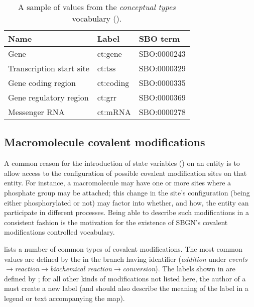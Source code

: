 \begin{table}[h]
  \centering
  \begin{tabular}{l>{\ttfamily}l>{\ttfamily}l}
    \toprule
    \textbf{Name}              & \textbf{\rmfamily Label} & \textbf{\rmfamily SBO term} \\
    \midrule
    Gene                      & ct:gene   & SBO:0000243\\
    Transcription start site  & ct:tss    & SBO:0000329\\
    Gene coding region        & ct:coding & SBO:0000335\\
    Gene regulatory region    & ct:grr    & SBO:0000369\\
    Messenger RNA             & ct:mRNA   & SBO:0000278\\
    \bottomrule
  \end{tabular}
  \caption{A sample of values from the \emph{conceptual types} vocabulary
    ().}
  \label{tab:conceptual-types-cv}
\end{table}


\subsection{Macromolecule covalent modifications}
\label{sec:covalent-mod-cv}

A common reason for the introduction of state variables () on an entity is to allow access to the configuration of possible covalent modification sites on that entity.  For instance, a macromolecule may have one or more sites where a phosphate group may be attached; this change in the site's configuration (\ie being either phosphorylated or not) may factor into whether, and how, the entity can participate in different processes.  Being able to describe such modifications in a consistent fashion is the motivation for the existence of SBGN's covalent modifications controlled vocabulary.  

 lists a number of common types of covalent modifications.  The most common values are defined by the \sbo in the branch having identifier  (\emph{addition} under \emph{events}$\rightarrow$\emph{reaction}$\rightarrow$\emph{biochemical reaction}$\rightarrow$\emph{conversion}).  The labels shown in  are defined by \SBGNPDLone; for all other kinds of modifications not listed here, the author of a \PD must create a new label (and should also describe the meaning of the label in a legend or text accompanying the map).

